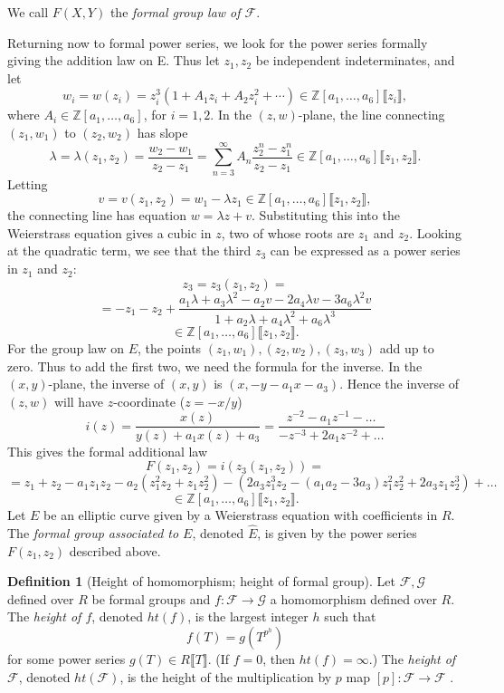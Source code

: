 \documentclass{article}
\theoremstyle{theorem}
\theoremstyle{definition}
\newtheorem{definition}{Definition}
\begin{document}
We call $F(X,Y)$ the \textit{formal group law of $\mathcal{F}$}.
 
Returning now to formal power series, we look for the power series formally giving the addition law on E. Thus let $z_1, z_2$ be independent indeterminates, and let 
	\[w_i = w(z_i) = z_i^3(1 + A_1z_i + A_2z_i^2 + \cdots) \in \mathbb{Z}[a_1, \dots, a_6]\llbracket z_i \rrbracket,\]
where $A_i \in \mathbb{Z}[a_1, \dots, a_6]$, for $i = 1, 2$. In the $(z, w)$-plane, the line connecting $(z_1, w_1)$ to $(z_2, w_2)$ has slope
	\[ \lambda = \lambda(z_1, z_2) = \frac{w_2 - w_1}{z_2 - z_1} = \sum_{n = 3}^{\infty} A_n\frac{z_2^n -z_1^n}{z_2 - z_1} \in \mathbb{Z}[a_1, \dots, a_6]\llbracket z_1, z_2 \rrbracket. \]
Letting
	\[v = v(z_1, z_2) = w_1 - \lambda z_1 \in \mathbb{Z}[a_1, \dots, a_6]\llbracket z_1, z_2 \rrbracket, \]
the connecting line has equation $w = \lambda z +v$. Substituting this into the Weierstrass equation gives a cubic in $z$, two of whose roots are $z_1$ and $z_2$. Looking at the quadratic term, we see that the third $z_3$ can be expressed as a power series in $z_1$ and $z_2$:
	\[z_3 = z_3(z_1, z_2) =\]
	\[= -z_1 -z_2 + \frac{a_1\lambda + a_3\lambda^2 -a_2v - 2a_4\lambda v - 3a_6\lambda^2v}{1 + a_2\lambda + a_4\lambda^2 + a_6\lambda^3}\]
	\[\in \mathbb{Z}[a_1, \dots, a_6]\llbracket z_1, z_2 \rrbracket.\]
For the group law on $E$, the points $(z_1, w_1), (z_2, w_2), (z_3, w_3)$ add up to zero. Thus to add the first two, we need the formula for the inverse. In the $(x, y)$-plane, the inverse of $(x, y)$ is $(x, -y -a_1x - a_3)$. Hence the inverse of $(z, w)$ will have $z$-coordinate ($z = -x/y$)
	\[ i(z) = \frac{x(z)}{y(z) + a_1x(z) + a_3} = \frac{z^{-2} - a_1z^{-1} - \dots}{-z^{-3} + 2a_1z^{-2} + \dots } \]
This gives the formal additional law 
	\[F(z_1, z_2) = i(z_3(z_1, z_2)) = \]
	\[= z_1 + z_2 - a_1z_1z_2 - a_2(z_1^2z_2 + z_1z_2^2) - (2a_3z_1^3z_2 - (a_1a_2 - 3a_3)z_1^2z_2^2 + 2a_3z_1z_2^3) + \dots \]
	\[\in \mathbb{Z}[a_1, \dots, a_6] \llbracket z_1, z_2 \rrbracket. \]
Let $E$ be an elliptic curve given by a Weierstrass equation with coefficients in $R$. The \textit{formal group associated to $E$}, denoted $\hat{E}$, is given by the power series $F(z_1, z_2)$ described above.
 
\begin{definition}[Height of homomorphism; height of formal group]
	Let $\mathcal{F}, \mathcal{G}$ defined over $R$ be formal groups and $f: \mathcal{F} \to \mathcal{G}$ a homomorphism defined over $R$. The \textit{height of $f$}, denoted $ht(f)$, is the largest integer $h$ such that 
		\[f(T) = g(T^{p^h}) \]
	for some power series $g(T) \in R \llbracket T \rrbracket$. (If $f = 0$, then $ht(f) = \infty$.) The \textit{height of $\mathcal{F}$}, denoted $ht(\mathcal{F})$, is the height of the multiplication by $p$ map $[p]: \mathcal{F} \to \mathcal{F}$ \cite[IV, \S7]{Silverman}.
\end{definition}
\end{document}
